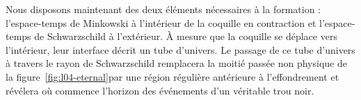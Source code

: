 Nous disposons maintenant des deux éléments nécessaires à la formation : l’espace-temps de Minkowski à l’intérieur de la coquille en contraction et l’espace-temps de Schwarzschild à l’extérieur. À mesure que la coquille se déplace vers l’intérieur, leur interface décrit un tube d’univers. Le passage de ce tube d’univers à travers le rayon de Schwarzschild remplacera la moitié passée non physique de la figure~\ref{fig:l04-eternal}par une région régulière antérieure à l’effondrement et révélera où commence l’horizon des événements d’un véritable trou noir.
